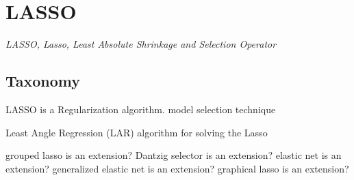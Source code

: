 
\section{LASSO} 
\label{sec:lasso}

\emph{LASSO, Lasso, Least Absolute Shrinkage and Selection Operator}

\subsection{Taxonomy}
LASSO is a Regularization algorithm.
model selection technique

Least Angle Regression (LAR) algorithm for solving the Lasso

grouped lasso is an extension?
Dantzig selector is an extension?
elastic net is an extension?
generalized elastic net is an extension?
graphical lasso is an extension?


